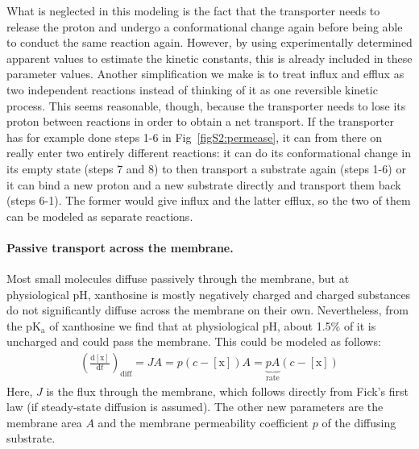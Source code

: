 \documentclass[10pt,letterpaper]{article}
\newcommand{\n}[1]{\mathrm{#1}}
\newcommand{\dd}[2]{\frac{\mathrm{d} #1}{\mathrm{d} #2}}
\begin{document}
What is neglected in this modeling is the fact that the transporter needs to release the proton and undergo a conformational change again before being able to conduct the same reaction again. However, by using experimentally determined apparent values to estimate the kinetic constants, this is already included in these parameter values. Another simplification we make is to treat influx and efflux as two independent reactions instead of thinking of it as one reversible kinetic process. This seems reasonable, though, because the transporter needs to lose its proton between reactions in order to obtain a net transport. If the transporter has for example done steps 1-6 in Fig~\ref{figS2:permease}, it can from there on really enter two entirely different reactions: it can do its conformational change in its empty state (steps 7 and 8) to then transport a substrate again (steps 1-6) or it can bind a new proton and a new substrate directly and transport them back (steps 6-1). The former would give influx and the latter efflux, so the two of them can be modeled as separate reactions.

\paragraph*{Passive transport across the membrane.}  
Most small molecules diffuse passively through the membrane, but at physiological pH, xanthosine is mostly negatively charged and charged substances do not significantly diffuse across the membrane on their own. Nevertheless, from the $\n{pK_a}$ of xanthosine we find that at physiological pH, about 1.5\% of it is uncharged and could pass the membrane. This could be modeled as follows:
\begin{eqnarray}
\label{eq:diff}
\left(\dd{\n{[x]}}{t}\right)_{\n{diff}} = J A = p (c-\n{[x]}) A = \underbrace{p A}_{\n{rate}} (c-\n{[x]})
\end{eqnarray}
Here, $J$ is the flux through the membrane, which follows directly from Fick's first law (if steady-state diffusion is assumed). The other new parameters are the membrane area $A$ and the membrane permeability coefficient $p$ of the diffusing substrate.
\end{document}
